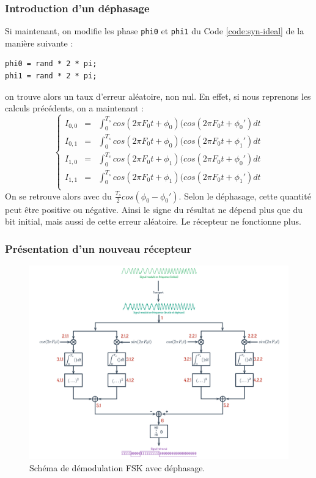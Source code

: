 \subsubsection{Introduction d'un déphasage}
Si maintenant, on modifie les phase \lstinline{phi0} et \lstinline{phi1} du Code \ref{code:syn-ideal} de la manière suivante :
\begin{lstlisting}[caption=Introduction d'un déphasage]
phi0 = rand * 2 * pi;
phi1 = rand * 2 * pi;
\end{lstlisting}
on trouve alors un taux d'erreur aléatoire, non nul.
En effet, si nous reprenons les calculs précédents, on a maintenant :
\[
   \left\{
   \begin{array}{rcl}
      I_{0, 0} & = & \int_{0}^{T_s}  cos( 2 \pi F_0 t + \phi_0 )(cos(2\pi F_0t+\phi_0') dt \\
      I_{0, 1} & = & \int_{0}^{T_s}  cos( 2 \pi F_0 t + \phi_0 )(cos(2\pi F_0t+\phi_1') dt \\
      I_{1, 0} & = & \int_{0}^{T_s}  cos( 2 \pi F_0 t + \phi_1 )(cos(2\pi F_0t+\phi_0') dt \\
      I_{1, 1} & = & \int_{0}^{T_s}  cos( 2 \pi F_0 t + \phi_1 )(cos(2\pi F_0t+\phi_1') dt \\
   \end{array}
   \right.
\]
On se retrouve alors avec du $\frac{T_s}{2}cos(\phi_0-\phi_0')$. Selon le déphasage, cette quantité peut être positive ou négative. Ainsi le signe du résultat ne dépend plus que du bit initial, mais aussi de cette erreur aléatoire.
Le récepteur ne fonctionne plus.
\subsubsection{Présentation d'un nouveau récepteur}

\begin{figure}[H]
   \centering
   \includegraphics[scale=0.2]{partie-3/sous-partie-2/filtre2.png}
   \caption{Schéma de démodulation FSK avec déphasage.} \label{fig:filtre2}
\end{figure}


